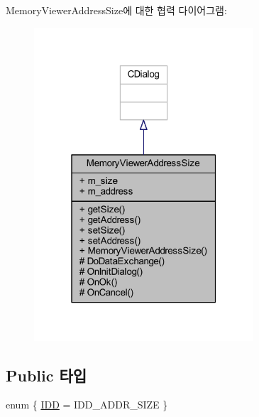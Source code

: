 Memory\+Viewer\+Address\+Size에 대한 협력 다이어그램\+:\nopagebreak
\begin{figure}[H]
\begin{center}
\leavevmode
\includegraphics[width=232pt]{class_memory_viewer_address_size__coll__graph}
\end{center}
\end{figure}
\subsection*{Public 타입}
\begin{DoxyCompactItemize}
\item 
enum \{ \mbox{\hyperlink{class_memory_viewer_address_size_a20a7438413cb28be1f8a838f6f07dd1aaf952aee8c8eac701dc1be256e60f4753}{I\+DD}} = I\+D\+D\+\_\+\+A\+D\+D\+R\+\_\+\+S\+I\+ZE
 \}
\end{DoxyCompactItemize}
